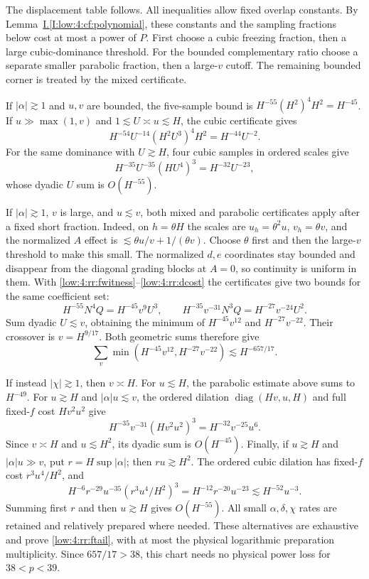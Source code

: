 \documentclass[11pt]{amsart}
\theoremstyle{definition}
\theoremstyle{remark}
\newcommand{\abs}[1]{\lvert #1\rvert}
\DeclareMathOperator{\diag}{diag}
\numberwithin{equation}{section}
\newcommand{\partIref}[1]{\hyperref[I:#1]{I.\ref*{I:#1}}}
\begin{document}
The displacement table follows. All inequalities allow fixed overlap constants. By Lemma~\partIref{low:4:cf:polynomial}, these constants and the sampling fractions below cost at most a power of $P$. First choose a cubic freezing fraction, then a large cubic-dominance threshold. For the bounded complementary ratio choose a separate smaller parabolic fraction, then a large-$v$ cutoff. The remaining bounded corner is treated by the mixed certificate. 

If $\abs\alpha\gtrsim1$ and $u,v$ are bounded, the five-sample bound is $H^{-55}(H^2)^4H^2=H^{-45}$. If $u\gg\max(1,v)$ and $1\lesssim U\asymp u\lesssim H$, the cubic certificate gives
\[
H^{-54}U^{-14}(H^2U^3)^4H^2=H^{-44}U^{-2}.
\]
For the same dominance with $U\gtrsim H$, four cubic samples in ordered scales give
\[
H^{-35}U^{-35}(HU^4)^3=H^{-32}U^{-23},
\]
whose dyadic $U$ sum is $O(H^{-55})$.

If $\abs\alpha\gtrsim1$, $v$ is large, and $u\lesssim v$, both mixed and parabolic certificates apply after a fixed short fraction. Indeed, on $h=\theta H$ the scales are $u_h=\theta^2u$, $v_h=\theta v$, and the normalized $A$ effect is $\lesssim\theta u/v+1/(\theta v)$. Choose $\theta$ first and then the large-$v$ threshold to make this small. The normalized $d,e$ coordinates stay bounded and disappear from the diagonal grading blocks at $A=0$, so continuity is uniform in them. With \eqref{low:4:rr:fwitness}--\eqref{low:4:rr:dcost} the certificates give two bounds for the same coefficient set:
\[
H^{-55}N^4Q=H^{-45}v^9U^3,\qquad
H^{-35}v^{-31}N^3Q=H^{-27}v^{-24}U^2.
\]
Sum dyadic $U\lesssim v$, obtaining the minimum of $H^{-45}v^{12}$ and $H^{-27}v^{-22}$. Their crossover is $v=H^{9/17}$. Both geometric sums therefore give
\begin{equation}\label{low:4:rr:ftail}
\sum_v\min(H^{-45}v^{12},H^{-27}v^{-22})\lesssim H^{-657/17}.
\end{equation}

If instead $\abs\chi\gtrsim1$, then $v\asymp H$. For $u\lesssim H$, the parabolic estimate above sums to $H^{-49}$. For $u\gtrsim H$ and $\abs\alpha u\lesssim v$, the ordered dilation $\diag(Hv,u,H)$ and full fixed-$f$ cost $Hv^2u^2$ give
\[
H^{-35}v^{-31}(Hv^2u^2)^3=H^{-32}v^{-25}u^6.
\]
Since $v\asymp H$ and $u\lesssim H^2$, its dyadic sum is $O(H^{-45})$. Finally, if $u\gtrsim H$ and $\abs\alpha u\gg v$, put $r=H\sup\abs\alpha$; then $ru\gtrsim H^2$. The ordered cubic dilation has fixed-$f$ cost $r^3u^4/H^2$, and
\[
H^{-6}r^{-29}u^{-35}(r^3u^4/H^2)^3
=H^{-12}r^{-20}u^{-23}\lesssim H^{-52}u^{-3}.
\]
Summing first $r$ and then $u\gtrsim H$ gives $O(H^{-55})$. All small $\alpha,\delta,\chi$ rates are retained and relatively prepared where needed. These alternatives are exhaustive and prove \eqref{low:4:rr:ftail}, with at most the physical logarithmic preparation multiplicity. Since $657/17>38$, this chart needs no physical power loss for $38<p<39$.
\end{document}
